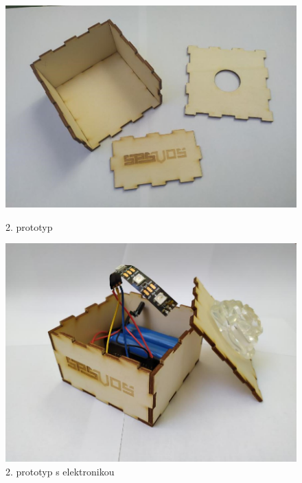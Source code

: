 \begin{figure}[htbp]
	\centering
	\begin{minipage}[b]{0.45\textwidth}
		\centering
		\includegraphics[width=1.1\textwidth]{img/06 zakl/Box.jpg}
		\caption{2. prototyp}
	\end{minipage}
	\qquad
	\begin{minipage}[b]{0.45\textwidth}
		\centering
		\includegraphics[width=1.01\textwidth]{img/06 zakl/2. prototyp s ele2 .jpg}
		\caption{2. prototyp s elektronikou}
	\end{minipage}
\end{figure}

\newpage
